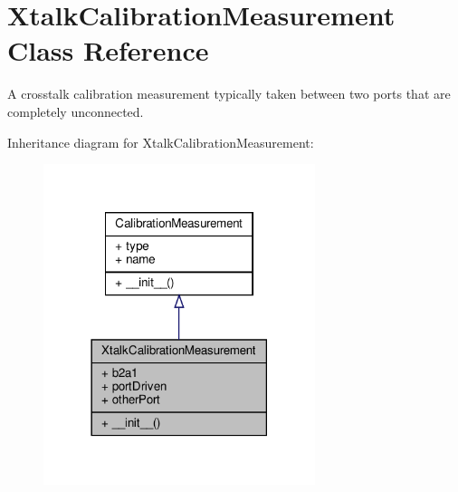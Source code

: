 \hypertarget{classSignalIntegrity_1_1Measurement_1_1Calibration_1_1CalibrationMeasurements_1_1XtalkCalibrationMeasurement}{}\section{Xtalk\+Calibration\+Measurement Class Reference}
\label{classSignalIntegrity_1_1Measurement_1_1Calibration_1_1CalibrationMeasurements_1_1XtalkCalibrationMeasurement}


A crosstalk calibration measurement typically taken between two ports that are completely unconnected.  




Inheritance diagram for Xtalk\+Calibration\+Measurement\+:
\nopagebreak
\begin{figure}[H]
\begin{center}
\leavevmode
\includegraphics[width=225pt]{classSignalIntegrity_1_1Measurement_1_1Calibration_1_1CalibrationMeasurements_1_1XtalkCalibrationMeasurement__inherit__graph}
\end{center}
\end{figure}


